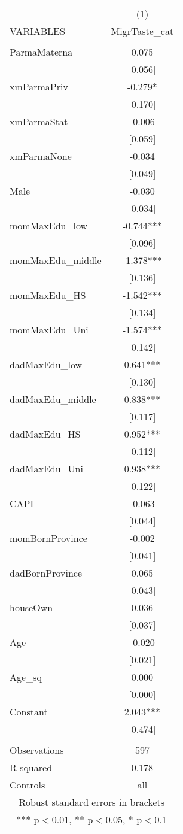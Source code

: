 \documentclass[]{article}
\begin{document}
\begin{tabular}{lc} \hline
 & (1) \\
VARIABLES & MigrTaste\_cat \\ \hline
 &  \\
ParmaMaterna & 0.075 \\
 & [0.056] \\
xmParmaPriv & -0.279* \\
 & [0.170] \\
xmParmaStat & -0.006 \\
 & [0.059] \\
xmParmaNone & -0.034 \\
 & [0.049] \\
Male & -0.030 \\
 & [0.034] \\
momMaxEdu\_low & -0.744*** \\
 & [0.096] \\
momMaxEdu\_middle & -1.378*** \\
 & [0.136] \\
momMaxEdu\_HS & -1.542*** \\
 & [0.134] \\
momMaxEdu\_Uni & -1.574*** \\
 & [0.142] \\
dadMaxEdu\_low & 0.641*** \\
 & [0.130] \\
dadMaxEdu\_middle & 0.838*** \\
 & [0.117] \\
dadMaxEdu\_HS & 0.952*** \\
 & [0.112] \\
dadMaxEdu\_Uni & 0.938*** \\
 & [0.122] \\
CAPI & -0.063 \\
 & [0.044] \\
momBornProvince & -0.002 \\
 & [0.041] \\
dadBornProvince & 0.065 \\
 & [0.043] \\
houseOwn & 0.036 \\
 & [0.037] \\
Age & -0.020 \\
 & [0.021] \\
Age\_sq & 0.000 \\
 & [0.000] \\
Constant & 2.043*** \\
 & [0.474] \\
 &  \\
Observations & 597 \\
R-squared & 0.178 \\
 Controls & all \\ \hline
\multicolumn{2}{c}{ Robust standard errors in brackets} \\
\multicolumn{2}{c}{ *** p$<$0.01, ** p$<$0.05, * p$<$0.1} \\
\end{tabular}
\end{document}
